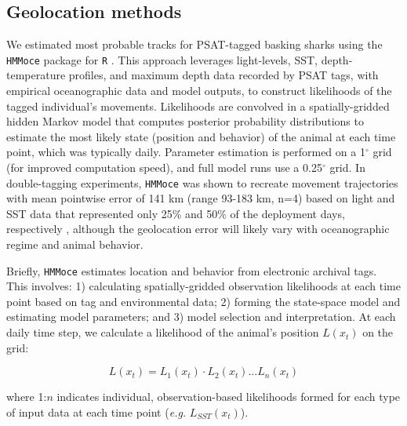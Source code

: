 \subsection{Geolocation methods}
We estimated most probable tracks for PSAT-tagged basking sharks using the \texttt{HMMoce} package \citep[][Chapter \ref{chap:2}]{Braun2018a} for \texttt{R} \citep{RDevelopmentCoreTeam2015}. This approach leverages light-levels, SST, depth-temperature profiles, and maximum depth data recorded by PSAT tags, with empirical oceanographic data and model outputs, to construct likelihoods of the tagged individual's movements. Likelihoods are convolved in a spatially-gridded hidden Markov model that computes posterior probability distributions to estimate the most likely state (position and behavior) of the animal at each time point, which was typically daily. Parameter estimation is performed on a 1$^{\circ}$ grid (for improved computation speed), and full model runs use a 0.25$^{\circ}$ grid. In double-tagging experiments, \texttt{HMMoce} was shown to recreate movement trajectories with mean pointwise error of 141 km (range 93-183 km, n=4) based on light and SST data that represented only 25\% and 50\% of the deployment days, respectively \citep[][Chapter \ref{chap:2}]{Braun2018a}, although the geolocation error will likely vary with oceanographic regime and animal behavior.

Briefly, \texttt{HMMoce} estimates location and behavior from electronic archival tags. This involves: 1) calculating spatially-gridded observation likelihoods at each time point based on tag and environmental data; 2) forming the state-space model and estimating model parameters; and 3) model selection and interpretation. At each daily time step, we calculate a likelihood of the animal's position $L(x_t)$ on the grid:

\begin{equation}
\label{eq:c3e1}
L(x_t) = L_1(x_t) \cdot L_2(x_t) ... L_n(x_t)
\end{equation}

where 1:$n$ indicates individual, observation-based likelihoods formed for each type of input data at each time point (\emph{e.g.} $L_{SST}(x_t)$).

